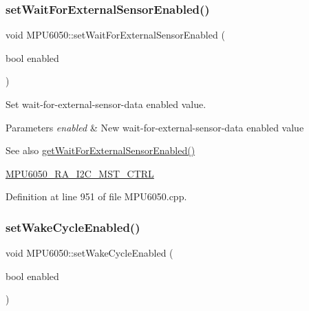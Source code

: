 \subsubsection{\texorpdfstring{setWaitForExternalSensorEnabled()}{setWaitForExternalSensorEnabled()}}
{\footnotesize\ttfamily void M\+P\+U6050\+::set\+Wait\+For\+External\+Sensor\+Enabled (\begin{DoxyParamCaption}\item[{bool}]{enabled }\end{DoxyParamCaption})}

Set wait-\/for-\/external-\/sensor-\/data enabled value. 
\begin{DoxyParams}{Parameters}
{\em enabled} & New wait-\/for-\/external-\/sensor-\/data enabled value \\
\hline
\end{DoxyParams}
\begin{DoxySeeAlso}{See also}
\mbox{\hyperlink{classMPU6050_a4e2ebda47b85b4c5463f041c790bf5c0}{get\+Wait\+For\+External\+Sensor\+Enabled()}} 

\mbox{\hyperlink{MPU6050_8h_ae4804708dd5f21dbca1ff1815b883504}{M\+P\+U6050\+\_\+\+R\+A\+\_\+\+I2\+C\+\_\+\+M\+S\+T\+\_\+\+C\+T\+RL}} 
\end{DoxySeeAlso}


Definition at line 951 of file M\+P\+U6050.\+cpp.


\begin{DoxyCode}{0}

\end{DoxyCode}
\mbox{\label{classMPU6050_a340eade71cf6286f6904c2021330944e}} 
\subsubsection{\texorpdfstring{setWakeCycleEnabled()}{setWakeCycleEnabled()}}
{\footnotesize\ttfamily void M\+P\+U6050\+::set\+Wake\+Cycle\+Enabled (\begin{DoxyParamCaption}\item[{bool}]{enabled }\end{DoxyParamCaption})}

